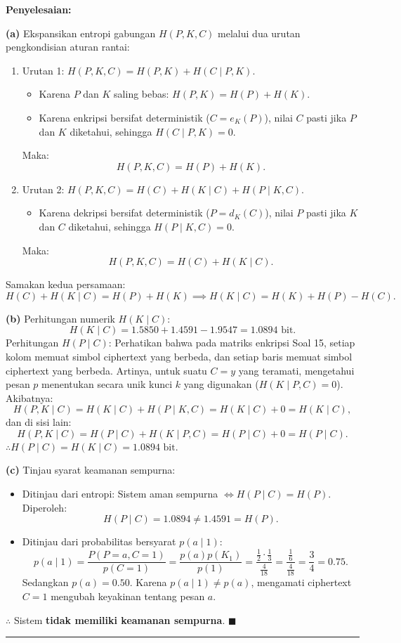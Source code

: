 \documentclass[11pt,a4paper]{article}
\newenvironment{solusi}{\noindent\textbf{\textsf{Penyelesaian:}}\par\vspace{0.2em}}{\hfill$\blacksquare$\vspace{1em}\par\hrule\vspace{1em}}
\begin{document}
\begin{solusi}
\textbf{(a)} Ekspansikan entropi gabungan $H(P, K, C)$ melalui dua urutan pengkondisian aturan rantai:
\begin{enumerate}[leftmargin=*]
    \item Urutan 1: $H(P, K, C) = H(P, K) + H(C \mid P, K)$.
    \begin{itemize}
        \item Karena $P$ dan $K$ saling bebas: $H(P, K) = H(P) + H(K)$.
        \item Karena enkripsi bersifat deterministik ($C = e_K(P)$), nilai $C$ pasti jika $P$ dan $K$ diketahui, sehingga $H(C \mid P, K) = 0$.
    \end{itemize}
    Maka:
    \[
    H(P, K, C) = H(P) + H(K).
    \]
    
    \item Urutan 2: $H(P, K, C) = H(C) + H(K \mid C) + H(P \mid K, C)$.
    \begin{itemize}
        \item Karena dekripsi bersifat deterministik ($P = d_K(C)$), nilai $P$ pasti jika $K$ dan $C$ diketahui, sehingga $H(P \mid K, C) = 0$.
    \end{itemize}
    Maka:
    \[
    H(P, K, C) = H(C) + H(K \mid C).
    \]
\end{enumerate}
Samakan kedua persamaan:
\[
H(C) + H(K \mid C) = H(P) + H(K) \implies H(K \mid C) = H(K) + H(P) - H(C).
\]

\textbf{(b)} Perhitungan numerik $H(K \mid C)$:
\[
H(K \mid C) = 1.5850 + 1.4591 - 1.9547 = 1.0894 \text{ bit}.
\]
Perhitungan $H(P \mid C)$:
Perhatikan bahwa pada matriks enkripsi Soal 15, setiap kolom memuat simbol ciphertext yang berbeda, dan setiap baris memuat simbol ciphertext yang berbeda. Artinya, untuk suatu $C = y$ yang teramati, mengetahui pesan $p$ menentukan secara unik kunci $k$ yang digunakan ($H(K \mid P, C) = 0$).
Akibatnya:
\[
H(P, K \mid C) = H(K \mid C) + H(P \mid K, C) = H(K \mid C) + 0 = H(K \mid C),
\]
dan di sisi lain:
\[
H(P, K \mid C) = H(P \mid C) + H(K \mid P, C) = H(P \mid C) + 0 = H(P \mid C).
\]
$\therefore H(P \mid C) = H(K \mid C) = 1.0894 \text{ bit}$.

\textbf{(c)} Tinjau syarat keamanan sempurna:
\begin{itemize}
    \item Ditinjau dari entropi: Sistem aman sempurna $\iff H(P \mid C) = H(P)$.
    Diperoleh:
    \[
    H(P \mid C) = 1.0894 \ne 1.4591 = H(P).
    \]
    \item Ditinjau dari probabilitas bersyarat $p(a \mid 1)$:
    \[
    p(a \mid 1) = \frac{P(P=a, C=1)}{p(C=1)} = \frac{p(a) p(K_1)}{p(1)} = \frac{\frac{1}{2} \cdot \frac{1}{3}}{\frac{4}{18}} = \frac{\frac{1}{6}}{\frac{4}{18}} = \frac{3}{4} = 0.75.
    \]
    Sedangkan $p(a) = 0.50$. Karena $p(a \mid 1) \ne p(a)$, mengamati ciphertext $C=1$ mengubah keyakinan tentang pesan $a$.
\end{itemize}
$\therefore$ Sistem \textbf{tidak memiliki keamanan sempurna}.
\end{solusi}
\end{document}
